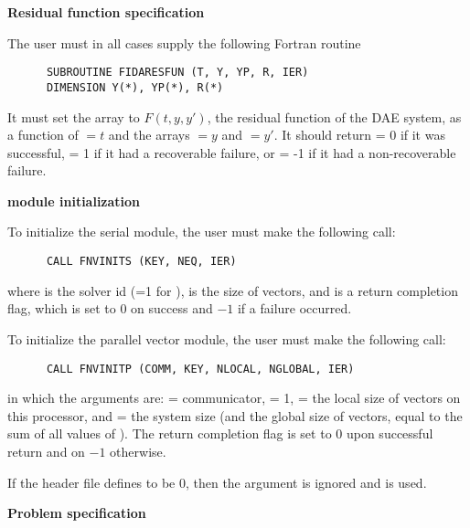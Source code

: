 \begin{Steps}
  
\item {\bf Residual function specification}
  
  The user must in all cases supply the following Fortran routine
\begin{verbatim}
      SUBROUTINE FIDARESFUN (T, Y, YP, R, IER)
      DIMENSION Y(*), YP(*), R(*)
\end{verbatim}
  It must set the  array to $F(t,y,y')$, the residual function of the DAE
  system, as a function of  $ = t$ and the arrays  $ = y$ and
   $ = y'$.  It should return  = 0 if it was successful,
   = 1 if it had a recoverable failure, or
   = -1 if it had a non-recoverable failure.
  
\item  {\bf {\nvector} module initialization}

  {\s} To initialize the serial {\nvector} module, the user must make the
  following call:
\begin{verbatim}
      CALL FNVINITS (KEY, NEQ, IER)
\end{verbatim}
  where 
   is the solver id (=1 for {\ida}),
   is the size of vectors, and
   is a  return completion flag, which is set to $0$ on success and $-1$ 
  if a failure occurred.
  
  {\p} To initialize the parallel vector module, the user must make the
  following call:
\begin{verbatim}
      CALL FNVINITP (COMM, KEY, NLOCAL, NGLOBAL, IER)
\end{verbatim}
  in which the arguments are:  = {\mpi} communicator,  = 1,
   = the local size of vectors on this processor, and
   = the system size (and the global size of vectors, equal to the
  sum of all values of ). The return completion flag  is
  set to $0$ upon successful return and on $-1$ otherwise.

  {\warn} If the header file  defines
   to be $0$, then the argument
   is ignored and  is used.
  
\item {\bf Problem specification}


\end{Steps}
